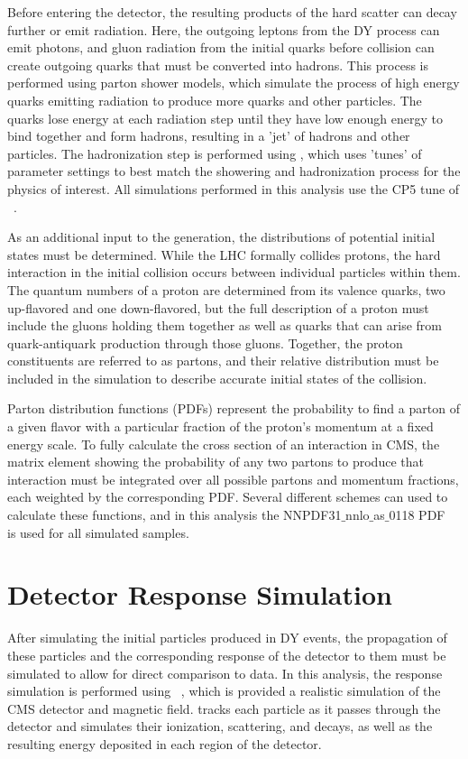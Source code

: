 Before entering the detector, the resulting products of the hard scatter can decay further or emit radiation.
Here, the outgoing leptons from the DY process can emit photons, and gluon radiation from the initial quarks before collision can create outgoing quarks that must be converted into hadrons. 
This process is performed using parton shower models, which simulate the process of high energy quarks emitting radiation to produce more quarks and other particles.
The quarks lose energy at each radiation step until they have low enough energy to bind together and form hadrons, resulting in a 'jet' of hadrons and other particles.
The hadronization step is performed using \pythia, which uses 'tunes' of parameter settings to best match the showering and hadronization process for the physics of interest. 
All simulations performed in this analysis use the CP5 tune of \pythia~\cite{pythia_tune}. 

As an additional input to the generation, the distributions of potential initial states must be determined.
While the LHC formally collides protons, the hard interaction in the initial collision occurs between individual particles within them.
The quantum numbers of a proton are determined from its valence quarks, two up-flavored and one down-flavored, but the full description of a proton must include the gluons holding them together as well as quarks that can arise from quark-antiquark production through those gluons. 
Together, the proton constituents are referred to as partons, and their relative distribution must be included in the simulation to describe accurate initial states of the collision.

Parton distribution functions (PDFs) represent the probability to find a parton of a given flavor with a particular fraction of the proton's momentum at a fixed energy scale.
To fully calculate the cross section of an interaction in CMS, the matrix element showing the probability of any two partons to produce that interaction must be integrated over all possible partons and momentum fractions, each weighted by the corresponding PDF. 
Several different schemes can used to calculate these functions, and in this analysis the NNPDF31$\_$nnlo$\_$as$\_$0118 PDF~\cite{nnpdf} is used for all simulated samples.

\section{Detector Response Simulation}

After simulating the initial particles produced in DY events, the propagation of these particles and the corresponding response of the detector to them must be simulated to allow for direct comparison to data.
In this analysis, the response simulation is performed using \geant~\cite{geantRef}, which is provided a realistic simulation of the CMS detector and magnetic field.
\geant tracks each particle as it passes through the detector and simulates their ionization, scattering, and decays, as well as the resulting energy deposited in each region of the detector.

